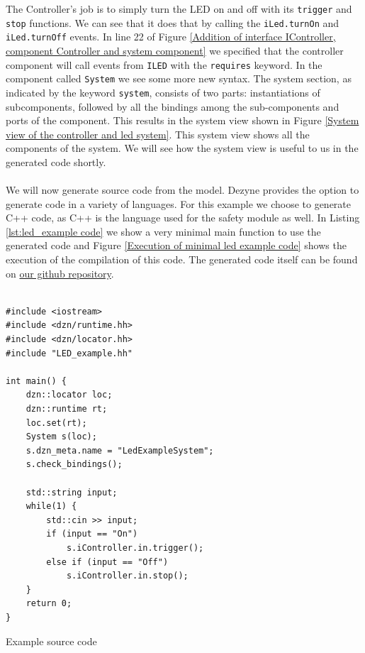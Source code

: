 \documentclass[12pt]{scrreprt}
\begin{document}
The Controller's job is to simply turn the LED on and off with its \texttt{trigger} and \texttt{stop} functions. We can see that it does that by calling the \texttt{iLed.turnOn} and \texttt{iLed.turnOff} events. In line 22 of Figure \ref{Addition of interface IController, component Controller and system component} we specified that the controller component will call events from \texttt{ILED} with the \texttt{requires} keyword. In the component called \texttt{System} we see some more new syntax.  The system section, as indicated by the keyword \texttt{system}, consists of two parts: instantiations of subcomponents, followed by all the bindings among the sub-components and ports of the component. This results in the system view shown in  Figure \ref{System view of the controller and led system}. This system view shows all the components of the system. We will see how the system view is useful to us in the generated code shortly.
\\\\
We will now generate source code from the model. Dezyne provides the option to generate code in a variety of languages. For this example we choose to generate C++ code, as C++ is the language used for the safety module as well. In Listing \ref{lst:led_example code} we show a very minimal main function to use the generated code and Figure \ref{Execution of minimal led example code} shows the execution of the compilation of this code. The generated code itself can be found on \href{https://github.com/Yousousen/safety-module-for-care-robot-rose.git}{our github repository}.

\begin{listing}[ht]
\begin{verbatim}
               
#include <iostream>
#include <dzn/runtime.hh>
#include <dzn/locator.hh>
#include "LED_example.hh"

int main() {
    dzn::locator loc;
    dzn::runtime rt;
    loc.set(rt);
    System s(loc);
    s.dzn_meta.name = "LedExampleSystem";
    s.check_bindings();

    std::string input;
    while(1) {
        std::cin >> input;
        if (input == "On")
            s.iController.in.trigger();
        else if (input == "Off")
            s.iController.in.stop();
    }
    return 0;
}

\end{verbatim}
\caption{Example source code}
\label{lst:led_example code}
\end{listing}
\end{document}
